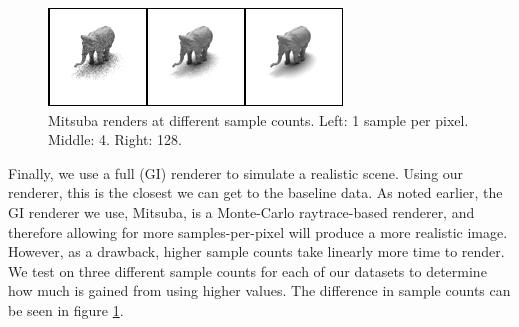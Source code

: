 \documentclass[10pt,twocolumn,letterpaper]{article}
\begin{document}
\begin{figure}[h!]
\centering
\includegraphics[width=1.0\columnwidth]{./assets/mitsuba-onerow.png}
\caption{
Mitsuba renders at different sample counts. Left: 1 sample per pixel.  Middle: 4.  Right: 128.}
\label{fig:differentsamplesraw}
\end{figure}
Finally, we use a full (GI) renderer to simulate a realistic scene. Using our renderer, this is the closest we can get to the baseline data. As noted earlier, the GI renderer we use, Mitsuba, is a Monte-Carlo raytrace-based renderer, and therefore allowing for more samples-per-pixel will produce a more realistic image. However, as a drawback, higher sample counts take linearly more time to render. 
We test on three different sample counts for each of our datasets to determine how much is gained from using higher values. The difference in sample counts can be seen in figure \ref{fig:differentsamplesraw}.
\end{document}
